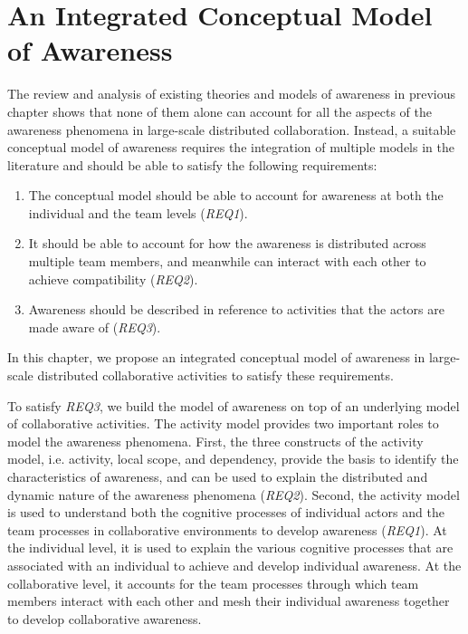 \graphicspath{{Figures/}}

\chapter{An Integrated Conceptual Model of Awareness} %
\label{cha:the_conceptual_framework}
The review and analysis of existing theories and models of awareness in previous chapter shows that none of them alone can account for all the aspects of the awareness phenomena in large-scale distributed collaboration. Instead, a suitable conceptual model of awareness requires the integration of multiple models in the literature and should be able to satisfy the following requirements:

\begin{enumerate}
	\item The conceptual model should be able to account for awareness at both the individual and the team levels (\emph{REQ1}).
	\item It should be able to account for how the awareness is distributed across multiple team members, and meanwhile can interact with each other to achieve compatibility (\emph{REQ2}). 
	\item Awareness should be described in reference to activities that the actors are made aware of (\emph{REQ3}).
\end{enumerate}

In this chapter, we propose an integrated conceptual model of awareness in large-scale distributed collaborative activities to satisfy these requirements. 

To satisfy \emph{REQ3}, we build the model of awareness on top of an underlying model of collaborative activities. The activity model provides two important roles to model the awareness phenomena. First, the three constructs of the activity model, i.e. activity, local scope, and dependency, provide the basis to identify the characteristics of awareness, and can be used to explain the distributed and dynamic nature of the awareness phenomena (\emph{REQ2}). Second, the activity model is used to understand both the cognitive processes of individual actors and the team processes in collaborative environments to develop awareness (\emph{REQ1}). At the individual level, it is used to explain the various cognitive processes that are associated with an individual to achieve and develop individual awareness. At the collaborative level, it accounts for the team processes through which team members interact with each other and mesh their individual awareness together to develop collaborative awareness. 

